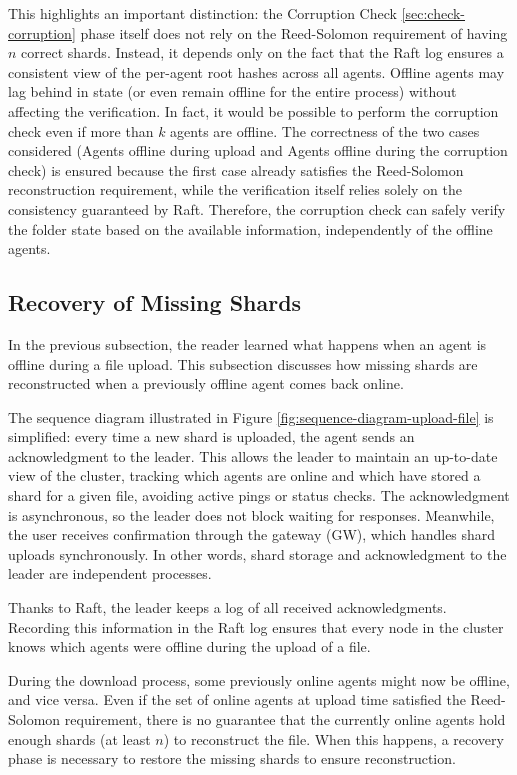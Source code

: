 This highlights an important distinction: the Corruption Check \ref{sec:check-corruption} phase itself does not rely on the Reed-Solomon requirement of having $n$ correct shards. Instead, it depends only on the fact that the Raft log ensures a consistent view of the per-agent root hashes across all agents. Offline agents may lag behind in state (or even remain offline for the entire process) without affecting the verification. In fact, it would be possible to perform the corruption check even if more than $k$ agents are offline. The correctness of the two cases considered (Agents offline during upload and Agents offline during the corruption check) is ensured because the first case already satisfies the Reed-Solomon reconstruction requirement, while the verification itself relies solely on the consistency guaranteed by Raft. Therefore, the corruption check can safely verify the folder state based on the available information, independently of the offline agents.

\subsection{Recovery of Missing Shards} \label{sec:recovery-of-missing-shards}

In the previous subsection, the reader learned what happens when an agent is offline during a file upload. This subsection discusses how missing shards are reconstructed when a previously offline agent comes back online.

The sequence diagram illustrated in Figure \ref{fig:sequence-diagram-upload-file} is simplified: every time a new shard is uploaded, the agent sends an acknowledgment to the leader. This allows the leader to maintain an up-to-date view of the cluster, tracking which agents are online and which have stored a shard for a given file, avoiding active pings or status checks. The acknowledgment is asynchronous, so the leader does not block waiting for responses. Meanwhile, the user receives confirmation through the gateway (GW), which handles shard uploads synchronously. In other words, shard storage and acknowledgment to the leader are independent processes.

Thanks to Raft, the leader keeps a log of all received acknowledgments. Recording this information in the Raft log ensures that every node in the cluster knows which agents were offline during the upload of a file. 

During the download process, some previously online agents might now be offline, and vice versa. Even if the set of online agents at upload time satisfied the Reed-Solomon requirement, there is no guarantee that the currently online agents hold enough shards (at least $n$) to reconstruct the file. When this happens, a recovery phase is necessary to restore the missing shards to ensure reconstruction.

